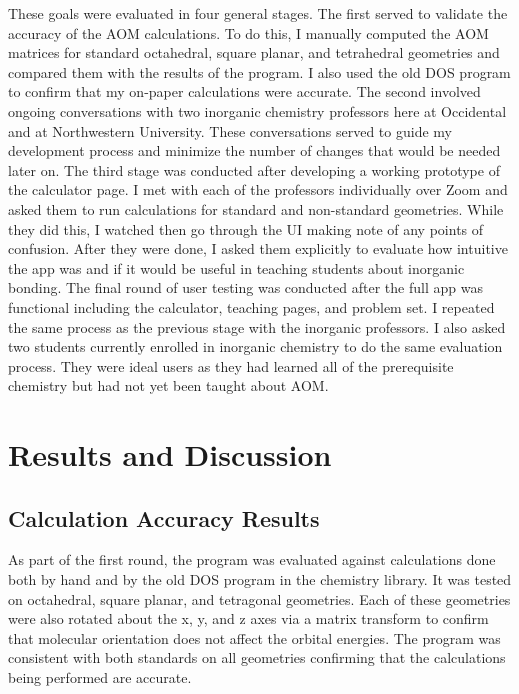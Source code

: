 \documentclass[10pt,twocolumn]{article}
\begin{document}
These goals were evaluated in four general stages. The first served to validate the accuracy of the AOM calculations. To do this, I manually computed the AOM matrices for standard octahedral, square planar, and tetrahedral geometries and compared them with the results of the program. I also used the old DOS program to confirm that my on-paper calculations were accurate. The second involved ongoing conversations with two inorganic chemistry professors here at Occidental and at Northwestern University. These conversations served to guide my development process and minimize the number of changes that would be needed later on. The third stage was conducted after developing a working prototype of the calculator page. I met with each of the professors individually over Zoom and asked them to run calculations for standard and non-standard geometries. While they did this, I watched then go through the UI making note of any points of confusion. After they were done, I asked them explicitly to evaluate how intuitive the app was and if it would be useful in teaching students about inorganic bonding. The final round of user testing was conducted after the full app was functional including the calculator, teaching pages, and problem set. I repeated the same process as the previous stage with the inorganic professors. I also asked two students currently enrolled in inorganic chemistry to do the same evaluation process. They were ideal users as they had learned all of the prerequisite chemistry but had not yet been taught about AOM. 

\section{Results and Discussion}
\subsection{Calculation Accuracy Results}
As part of the first round, the program was evaluated against calculations done both by hand and by the old DOS program in the chemistry library. It was tested on octahedral, square planar, and tetragonal geometries. Each of these geometries were also rotated about the x, y, and z axes via a matrix transform to confirm that molecular orientation does not affect the orbital energies. The program was consistent with both standards on all geometries confirming that the calculations being performed are accurate.
\end{document}

